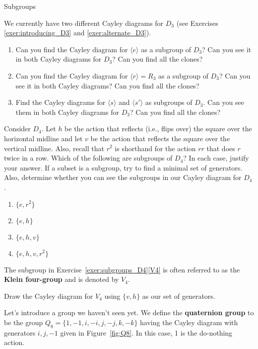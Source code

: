 \begin{section}{Subgroups}
\begin{exercise}
We currently have two different Cayley diagrams for $D_3$ (see Exercises \ref{exer:introducing_D3} and \ref{exer:alternate_D3}).  
\begin{enumerate}[label=\rm{(\alph*)}]
\item Can you find the Cayley diagram for $\langle e\rangle$ as a subgroup of $D_3$?  Can you see it in both Cayley diagrams for $D_3$?  Can you find all the clones?
\item Can you find the Cayley diagram for $\langle r\rangle =R_3$ as a subgroup of $D_3$?  Can you see it in both Cayley diagrams?  Can you find all the clones?
\item Find the Cayley diagrams for $\langle s\rangle$ and $\langle s'\rangle$ as subgroups of $D_3$.  Can you see them in both Cayley diagrams for $D_3$?  Can you find all the clones?
\end{enumerate}
\end{exercise}

\begin{exercise}\label{exer:subgroups_D4}
Consider $D_4$.  Let $h$ be the action that reflects (i.e., flips over) the square over the horizontal midline and let $v$ be the action that reflects the square over the vertical midline.  Also, recall that $r^2$ is shorthand for the action $rr$ that does $r$ twice in a row.  Which of the following are subgroups of $D_4$?  In each case, justify your answer.  If a subset is a subgroup, try to find a minimal set of generators.  Also, determine whether you can see the subgroups in our Cayley diagram for $D_4$.
\begin{enumerate}[label=\rm{(\alph*)}]
\item $\{e, r^2\}$
\item $\{e,h\}$
\item $\{e, h, v\}$
\item\label{V4} $\{e, h, v, r^2\}$
\end{enumerate}
\end{exercise}

The subgroup in Exercise~\ref{exer:subgroups_D4}\ref{V4} is often referred to as the \textbf{Klein four-group} and is denoted by $V_4$.

\begin{exercise}\label{exer:V4}
Draw the Cayley diagram for $V_4$ using $\{v,h\}$ as our set of generators.
\end{exercise}

Let's introduce a group we haven't seen yet.  We define the \textbf{quaternion group} to be the group $Q_8=\{1,-1,i,-i,j,-j,k,-k\}$ having the Cayley diagram with generators $i, j, -1$ given in Figure~\ref{fig:Q8}.  In this case, 1 is the do-nothing action.


\end{section}
